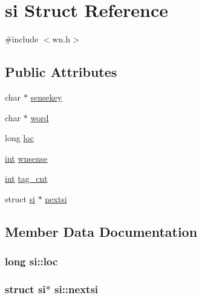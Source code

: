 \hypertarget{structsi}{}\section{si Struct Reference}
\label{structsi}


{\ttfamily \#include $<$wn.\+h$>$}

\subsection*{Public Attributes}
\begin{DoxyCompactItemize}
\item 
char $\ast$ \hyperlink{structsi_a7d25bf9fa3d1e894b3ae00f566ae9ac3}{sensekey}
\item 
char $\ast$ \hyperlink{structsi_aa35a67e5e45bbaca9d67987fa30d2db7}{word}
\item 
long \hyperlink{structsi_a573254d3379e963da558dab37028026b}{loc}
\item 
\hyperlink{tk_8h_a83f82f76e7fed06f4c49d2db94028a6d}{int} \hyperlink{structsi_af11b305927aaf7756d19b368c9773633}{wnsense}
\item 
\hyperlink{tk_8h_a83f82f76e7fed06f4c49d2db94028a6d}{int} \hyperlink{structsi_a97565b93a0664af82de3e39367f4d858}{tag\+\_\+cnt}
\item 
struct \hyperlink{structsi}{si} $\ast$ \hyperlink{structsi_a5cd5584a9a3a7aea720b822375204cee}{nextsi}
\end{DoxyCompactItemize}


\subsection{Member Data Documentation}
\subsubsection[{\texorpdfstring{loc}{loc}}]{\setlength{\rightskip}{0pt plus 5cm}long si\+::loc}\hypertarget{structsi_a573254d3379e963da558dab37028026b}{}\label{structsi_a573254d3379e963da558dab37028026b}
\subsubsection[{\texorpdfstring{nextsi}{nextsi}}]{\setlength{\rightskip}{0pt plus 5cm}struct {\bf si}$\ast$ si\+::nextsi}\hypertarget{structsi_a5cd5584a9a3a7aea720b822375204cee}{}\label{structsi_a5cd5584a9a3a7aea720b822375204cee}
